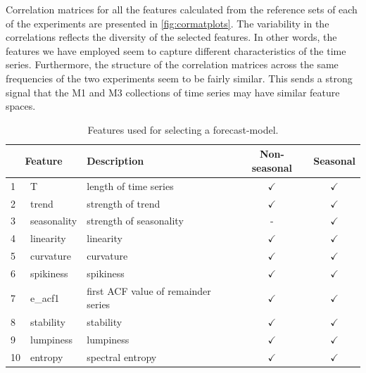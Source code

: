 \documentclass[11pt,a4paper,]{article}
\def\yes{$\checkmark$}
\begin{document}
Correlation matrices for all the features calculated from the reference sets of each of the experiments are presented in \autoref{fig:cormatplots}. The variability in the correlations reflects the diversity of the selected features. In other words, the features we have employed seem to capture different characteristics of the time series. Furthermore, the structure of the correlation matrices across the same frequencies of the two experiments seem to be fairly similar. This sends a strong signal that the M1 and M3 collections of time series may have similar feature spaces.

\begin{table}[!htp]
\centering\footnotesize\tabcolsep=0.12cm
\caption{Features used for selecting a forecast-model.}
\label{feature}
\begin{tabular}{llp{}cc}
\toprule
\multicolumn{2}{c}{Feature} & Description & Non-seasonal & Seasonal\\
\midrule
1  & T              & length of time series                                                                   & \yes  & \yes \\
2  & trend          & strength of trend                                                                       & \yes  & \yes\\
3  & seasonality    & strength of seasonality                                                                 & -     & \yes \\
4  & linearity      & linearity                                                                               & \yes  & \yes \\
5  & curvature      & curvature                                                                               & \yes  & \yes \\
6  & spikiness      & spikiness                                                                               & \yes  & \yes \\
7  & e\_acf1        & first ACF value of remainder series                                                     & \yes  & \yes \\
8  & stability      & stability                                                                               & \yes  & \yes \\
9  & lumpiness      & lumpiness                                                                               & \yes  & \yes \\
10 & entropy        & spectral entropy                                                                        & \yes  & \yes \\

\end{tabular}
\end{table}
\end{document}

